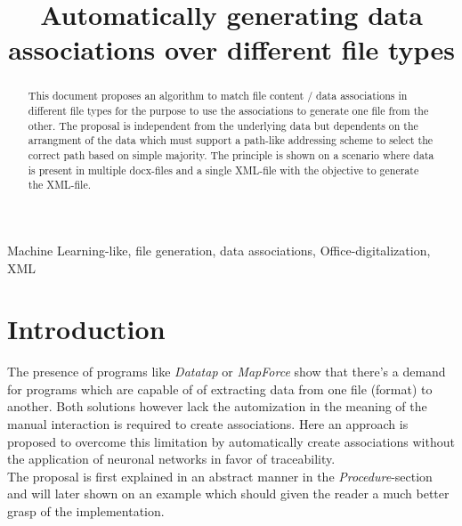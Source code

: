\documentclass[conference]{IEEEtran}
\begin{document}
\title{Automatically generating data associations over different file types}
\author{
}

\maketitle

\begin{abstract}
This document proposes an algorithm to match file content / data associations in different file
types for the purpose to use the associations to generate one file from the other. The proposal
is independent from the underlying data but dependents on the arrangment of the data which
must support a path-like addressing scheme to select the correct path based on simple majority.
The principle is shown on a scenario where data is present in multiple docx-files and a single
XML-file with the objective to generate the XML-file.
\end{abstract}

\begin{IEEEkeywords}
Machine Learning-like, file generation, data associations, Office-digitalization, XML
\end{IEEEkeywords}

\section{Introduction}
The presence of programs like \textit{Datatap} \cite{adverity:adverity} or \textit{MapForce}
\cite{altova:mapforce} show that there's a demand for programs which are capable of of extracting
data from one file (format) to another. Both solutions however lack the automization in the
meaning of the manual interaction is required to create associations. Here an approach is proposed
to overcome this limitation by automatically create associations without the application of
neuronal networks in favor of traceability.\\
The proposal is first explained in an abstract manner in the \textit{Procedure}-section and
will later shown on an example which should given the reader a much better grasp of the
implementation.
\end{document}
